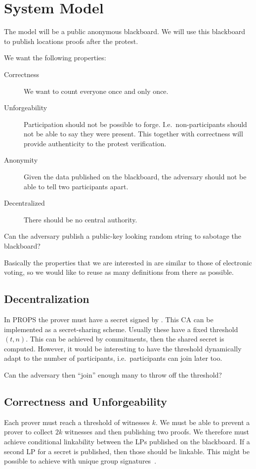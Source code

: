 \section{System Model}
\label{SystemModel}

The model will be a public anonymous blackboard.
We will use this blackboard to publish locations proofs after the protest.

We want the following properties:
\begin{description}
  \item[Correctness] We want to count everyone once and only once.
  \item[Unforgeability] Participation should not be possible to forge.
    I.e.\ non-participants should not be able to say they were present.
    This together with correctness will provide authenticity to the protest 
    verification.
  \item[Anonymity] Given the data published on the blackboard, the adversary 
    should not be able to tell two participants apart.
  \item[Decentralized] There should be no central authority.
\end{description}

Can the adversary publish a public-key looking random string to sabotage the 
blackboard?

Basically the properties that we are interested in are similar to those of 
electronic voting, so we would like to reuse as many definitions from there as 
possible.

\subsection{Decentralization}

In \ac{PROPS} the prover must have a secret signed by .
This \ac{CA} can be implemented as a secret-sharing scheme.
Usually these have a fixed threshold \((t, n)\).
This can be achieved by commitments, then the shared secret is computed.
However, it would be interesting to have the threshold dynamically adapt to the 
number of participants, i.e.\ participants can join later too.

Can the adversary then \enquote{join} enough many to throw off the threshold?

\subsection{Correctness and Unforgeability}

Each prover must reach a threshold of witnesses \(k\).
We must be able to prevent a prover to collect \(2k\) witnesses and then 
publishing two proofs.
We therefore must achieve conditional linkability between the \acp{LP} 
published on the blackboard.
If a second \ac{LP} for a secret is published, then those should be linkable.
This might be possible to achieve with unique group 
signatures~\cite{UniqueGroupSignatures,UniqueRingSignatures,ListSignatures}.


